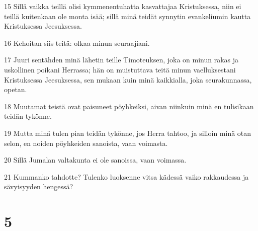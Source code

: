 \par 15 Sillä vaikka teillä olisi kymmenentuhatta kasvattajaa Kristuksessa, niin ei teillä kuitenkaan ole monta isää; sillä minä teidät synnytin evankeliumin kautta Kristuksessa Jeesuksessa.
\par 16 Kehoitan siis teitä: olkaa minun seuraajiani.
\par 17 Juuri sentähden minä lähetin teille Timoteuksen, joka on minun rakas ja uskollinen poikani Herrassa; hän on muistuttava teitä minun vaelluksestani Kristuksessa Jeesuksessa, sen mukaan kuin minä kaikkialla, joka seurakunnassa, opetan.
\par 18 Muutamat teistä ovat paisuneet pöyhkeiksi, aivan niinkuin minä en tulisikaan teidän tykönne.
\par 19 Mutta minä tulen pian teidän tykönne, jos Herra tahtoo, ja silloin minä otan selon, en noiden pöyhkeiden sanoista, vaan voimasta.
\par 20 Sillä Jumalan valtakunta ei ole sanoissa, vaan voimassa.
\par 21 Kummanko tahdotte? Tulenko luoksenne vitsa kädessä vaiko rakkaudessa ja sävyisyyden hengessä?

\chapter{5}

